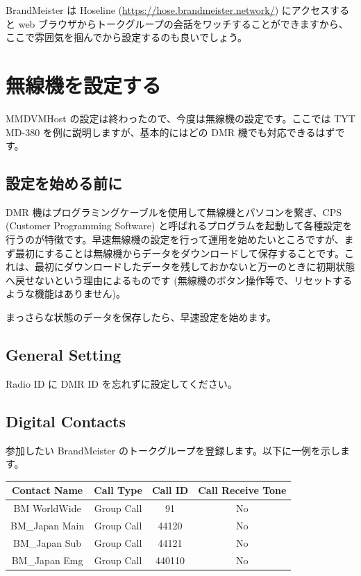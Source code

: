 \documentclass[a4j,oneside]{ujbook}
\begin{document}
BrandMeister は Hoseline (\url{https://hose.brandmeister.network/}) にアクセスすると web ブラウザからトークグループの会話をワッチすることができますから、ここで雰囲気を掴んでから設定するのも良いでしょう。

\section{無線機を設定する}

MMDVMHost の設定は終わったので、今度は無線機の設定です。ここでは TYT MD-380 を例に説明しますが、基本的にはどの DMR 機でも対応できるはずです。

\subsection*{設定を始める前に}

DMR 機はプログラミングケーブルを使用して無線機とパソコンを繋ぎ、CPS (Customer Programming Software) と呼ばれるプログラムを起動して各種設定を行うのが特徴です。早速無線機の設定を行って運用を始めたいところですが、まず最初にすることは無線機からデータをダウンロードして保存することです。これは、最初にダウンロードしたデータを残しておかないと万一のときに初期状態へ戻せないという理由によるものです (無線機のボタン操作等で、リセットするような機能はありません)。

まっさらな状態のデータを保存したら、早速設定を始めます。

\subsection*{General Setting}

Radio ID に DMR ID を忘れずに設定してください。

\subsection*{Digital Contacts}

参加したい BrandMeister のトークグループを登録します。以下に一例を示します。

\begin{center}
 \begin{tabular}{|c|c|c|c|}
  \hline
  {Contact Name} & {Call Type} & {Call ID} & {Call Receive Tone} \\
  \hline
  {BM WorldWide} & {Group Call} & 91 & No \\
  {BM\_Japan Main} & {Group Call} & 44120 & No \\
  {BM\_Japan Sub} & {Group Call} & 44121 & No \\
  {BM\_Japan Emg} & {Group Call} & 440110 & No \\
  \hline
 \end{tabular}
\end{center}
\end{document}
